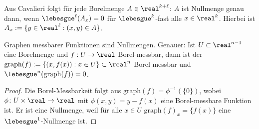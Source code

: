 \begin{exmp}
 Aus Cavalieri folgt für jede Borelmenge $A \in \real^{k+\ell}$: $A$ ist Nullmenge genau dann, wenn $\lebesgue^\ell( A_x ) = 0$ für $\lebesgue^k$-fast alle $x \in \real^k$. Hierbei ist $A_x := \{y \in \real^\ell:(x,y) \in A \}$.
\end{exmp}

\begin{folg}
 Graphen messbarer Funktionen sind Nullmengen. Genauer: Ist $U \subset \real^{n-1}$ eine Borelmenge und $f:U \to \real$ Borel-messbar, dann ist der $\mathrm{graph}(f) := \{ (x,f(x)) : x \in U \} \subset \real^n$ Borel-messbar und $\lebesgue^n (\mathrm{graph}(f) ) = 0$.
\end{folg}

\begin{proof}
 Die Borel-Messbarkeit folgt aus $\mathrm{graph}(f) = \phi^{-1}( \{ 0 \} )$, wobei $\phi\colon U \times \real \to \real$ mit $\phi(x,y) = y -f(x)$ eine Borel-messbare Funktion ist. Er ist eine Nullmenge, weil für alle $x \in U$ $\mathrm{graph}(f)_x = \{ f(x) \}$ eine $\lebesgue^1$-Nullmenge ist.
\end{proof}